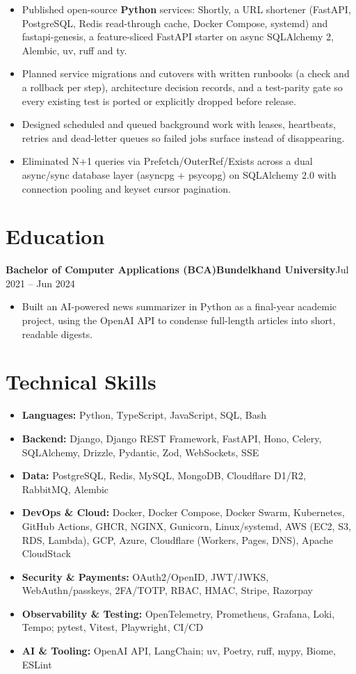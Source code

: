 \documentclass[11pt,a4paper]{article}
\newcommand{\entry}[3]{%
  \vspace{4.5pt}\noindent\textbf{#1}\hfill\textbf{#2}\hfill{\color{subtlegray}#3}\par\vspace{2pt}}
\begin{document}
\begin{itemize}
  \item Published open-source \textbf{Python} services: Shortly, a URL
        shortener (FastAPI, PostgreSQL, Redis read-through cache, Docker
        Compose, systemd) and fastapi-genesis, a feature-sliced FastAPI starter
        on async SQLAlchemy 2, Alembic, uv, ruff and ty.
  \item Planned service migrations and cutovers with written runbooks (a check
        and a rollback per step), architecture decision records, and a test-parity
        gate so every existing test is ported or explicitly dropped before release.
  \item Designed scheduled and queued background work with leases,
        heartbeats, retries and dead-letter queues so failed jobs surface
        instead of disappearing.
  \item Eliminated N+1 queries via Prefetch/OuterRef/Exists across a dual
        async/sync database layer (asyncpg + psycopg) on SQLAlchemy 2.0 with
        connection pooling and keyset cursor pagination.
\end{itemize}

\section{Education}
\entry{Bachelor of Computer Applications (BCA)}{Bundelkhand University}{Jul 2021 -- Jun 2024}
\begin{itemize}
  \item Built an AI-powered news summarizer in Python as a final-year academic
        project, using the OpenAI API to condense full-length articles into short,
        readable digests.
\end{itemize}

\section{Technical Skills}
\begin{itemize}
  \item \textbf{Languages:} Python, TypeScript, JavaScript, SQL, Bash
  \item \textbf{Backend:} Django, Django REST Framework, FastAPI, Hono, Celery, SQLAlchemy, Drizzle, Pydantic, Zod, WebSockets, SSE
  \item \textbf{Data:} PostgreSQL, Redis, MySQL, MongoDB, Cloudflare D1/R2, RabbitMQ, Alembic
  \item \textbf{DevOps \& Cloud:} Docker, Docker Compose, Docker Swarm, Kubernetes, GitHub Actions, GHCR, NGINX, Gunicorn, Linux/systemd, AWS (EC2, S3, RDS, Lambda), GCP, Azure, Cloudflare (Workers, Pages, DNS), Apache CloudStack
  \item \textbf{Security \& Payments:} OAuth2/OpenID, JWT/JWKS, WebAuthn/passkeys, 2FA/TOTP, RBAC, HMAC, Stripe, Razorpay
  \item \textbf{Observability \& Testing:} OpenTelemetry, Prometheus, Grafana, Loki, Tempo; pytest, Vitest, Playwright, CI/CD
  \item \textbf{AI \& Tooling:} OpenAI API, LangChain; uv, Poetry, ruff, mypy, Biome, ESLint
\end{itemize}
\end{document}
